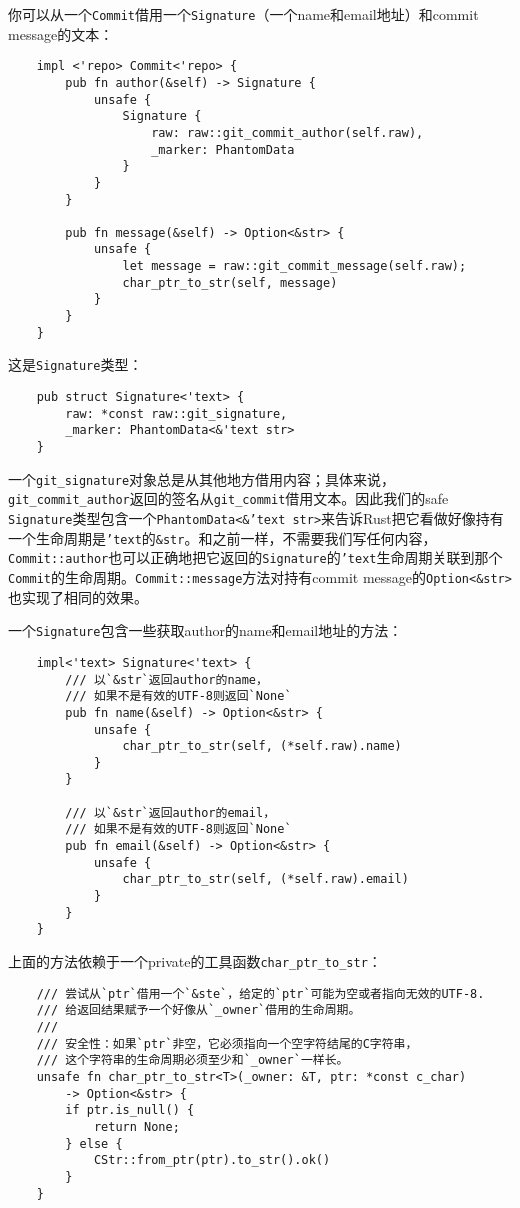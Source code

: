 你可以从一个\texttt{Commit}借用一个\texttt{Signature}（一个name和email地址）和commit message的文本：
\begin{verbatim}
    impl <'repo> Commit<'repo> {
        pub fn author(&self) -> Signature {
            unsafe {
                Signature {
                    raw: raw::git_commit_author(self.raw),
                    _marker: PhantomData
                }
            }
        }

        pub fn message(&self) -> Option<&str> {
            unsafe {
                let message = raw::git_commit_message(self.raw);
                char_ptr_to_str(self, message)
            }
        }
    }
\end{verbatim}

这是\texttt{Signature}类型：
\begin{verbatim}
    pub struct Signature<'text> {
        raw: *const raw::git_signature,
        _marker: PhantomData<&'text str>
    }
\end{verbatim}

一个\texttt{git\_signature}对象总是从其他地方借用内容；具体来说，\texttt{git\_commit\_author}返回的签名从\texttt{git\_commit}借用文本。因此我们的safe \texttt{Signature}类型包含一个\texttt{PhantomData<\&'text str>}来告诉Rust把它看做好像持有一个生命周期是\texttt{'text}的\texttt{\&str}。和之前一样，不需要我们写任何内容，\texttt{Commit::author}也可以正确地把它返回的\texttt{Signature}的\texttt{'text}生命周期关联到那个\texttt{Commit}的生命周期。\texttt{Commit::message}方法对持有commit message的\texttt{Option<\&str>}也实现了相同的效果。

一个\texttt{Signature}包含一些获取author的name和email地址的方法：
\begin{verbatim}
    impl<'text> Signature<'text> {
        /// 以`&str`返回author的name，
        /// 如果不是有效的UTF-8则返回`None`
        pub fn name(&self) -> Option<&str> {
            unsafe {
                char_ptr_to_str(self, (*self.raw).name)
            }
        }

        /// 以`&str`返回author的email，
        /// 如果不是有效的UTF-8则返回`None`
        pub fn email(&self) -> Option<&str> {
            unsafe {
                char_ptr_to_str(self, (*self.raw).email)
            }
        }
    }
\end{verbatim}

上面的方法依赖于一个private的工具函数\texttt{char\_ptr\_to\_str}：
\begin{verbatim}
    /// 尝试从`ptr`借用一个`&ste`，给定的`ptr`可能为空或者指向无效的UTF-8.
    /// 给返回结果赋予一个好像从`_owner`借用的生命周期。
    ///
    /// 安全性：如果`ptr`非空，它必须指向一个空字符结尾的C字符串，
    /// 这个字符串的生命周期必须至少和`_owner`一样长。
    unsafe fn char_ptr_to_str<T>(_owner: &T, ptr: *const c_char)
        -> Option<&str> {
        if ptr.is_null() {
            return None;
        } else {
            CStr::from_ptr(ptr).to_str().ok()
        }
    }
\end{verbatim}

